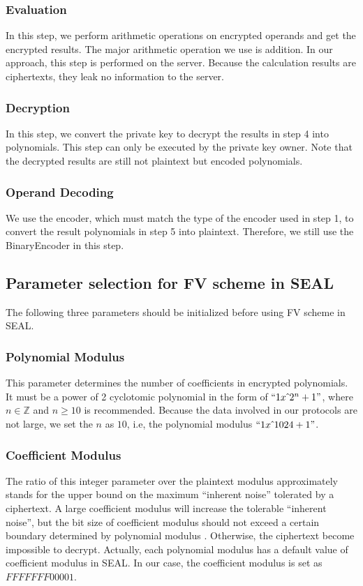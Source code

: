 \subsubsection{Evaluation}
In this step, we perform arithmetic operations on encrypted operands and get the encrypted results. The major arithmetic operation we use is addition. In our approach, this step is performed on the server. Because the calculation results are ciphertexts, they leak no information to the server.

\subsubsection{Decryption}
In this step, we convert the private key to decrypt the results in step 4 into polynomials. This step can only be executed by the private key owner. Note that the decrypted results are still not plaintext but encoded polynomials.

\subsubsection{Operand Decoding}
We use the encoder, which must match the type of the encoder used in step 1, to convert the result polynomials in step 5 into plaintext. Therefore, we still use the BinaryEncoder in this step.

\subsection{Parameter selection for FV scheme in SEAL}
\label{sec:para_sele}

The following three parameters should be initialized before using FV scheme in SEAL.

\subsubsection{Polynomial Modulus}
This parameter determines the number of coefficients in encrypted polynomials. It must be a power of 2 cyclotomic polynomial in the form of $``1x \,\hat{}\, 2^n + 1"$, where $n\in\mathbb{Z}$ and $n \geq 10$ is recommended. Because the data involved in our protocols are not large, we set the $n$ as $10$, i.e, the polynomial modulus $``1x \,\hat{}\, 1024 + 1"$.

\subsubsection{Coefficient Modulus}
The ratio of this integer parameter over the plaintext modulus approximately stands for the upper bound on the maximum ``inherent noise'' tolerated by a ciphertext. A large coefficient modulus will increase the tolerable ``inherent noise'', but the bit size of coefficient modulus should not exceed a certain boundary determined by polynomial modulus \cite{lepoint2014comparison}. Otherwise, the ciphertext become impossible to decrypt. Actually, each polynomial modulus has a default value of coefficient modulus in SEAL. In our case, the coefficient modulus is set as $FFFFFFF00001$.

